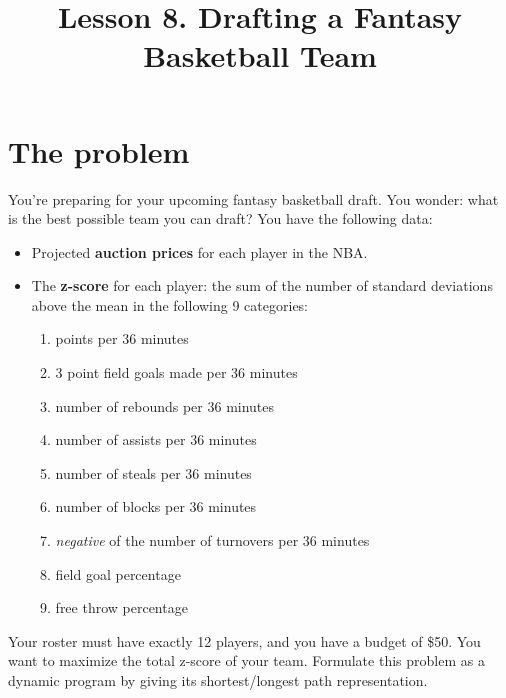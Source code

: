 \documentclass{SA367Spring2020}
\begin{document}
\title{Lesson 8. Drafting a Fantasy Basketball Team}

\maketitle

\section*{The problem}

You're preparing for your upcoming fantasy basketball draft. You wonder:
what is the best possible team you can draft?
You have the following data:

\begin{itemize}[topsep=0ex,parsep=0.5ex]
  \item Projected \textbf{auction prices} for each player in the NBA.
  \item The \textbf{z-score} for each player: the sum of the number of
    standard deviations above the mean in the following 9 categories:
    \begin{enumerate}[nolistsep]
      \item points per 36 minutes
      \item 3 point field goals made per 36 minutes
      \item number of rebounds per 36 minutes
      \item number of assists per 36 minutes
      \item number of steals per 36 minutes
      \item number of blocks per 36 minutes
      \item \emph{negative} of the number of turnovers per 36 minutes
      \item field goal percentage
      \item free throw percentage
    \end{enumerate}
\end{itemize}

Your roster must have exactly 12 players, and you have a budget of \$50.
You want to maximize the total z-score of your team.
Formulate this problem as a dynamic program by giving its
shortest/longest path representation.
\end{document}
